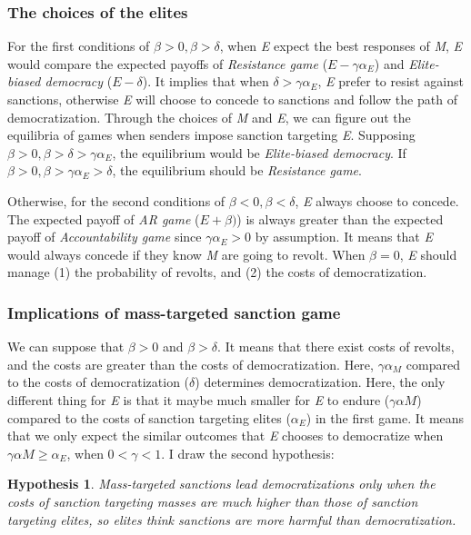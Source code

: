 \documentclass[11pt]{article}
\newtheorem{hyp}{Hypothesis}
\begin{document}
	\subsubsection*{The choices of the elites}
	
	For the first conditions of $\beta > 0, \beta > \delta$, when \textit{E} expect the best responses of \textit{M}, \textit{E} would compare the expected payoffs of \textit{Resistance game} ($E-\gamma\alpha_{E}$) and \textit{Elite-biased democracy} ($E-\delta$). It implies that when $\delta > \gamma\alpha_{E}$, \textit{E} prefer to resist against sanctions, otherwise \textit{E} will choose to concede to sanctions and follow the path of democratization. Through the choices of \textit{M} and \textit{E}, we can figure out the equilibria of games when senders impose sanction targeting \textit{E}. Supposing $\beta > 0, \beta > \delta > \gamma\alpha_{E}$, the equilibrium would be \textit{Elite-biased democracy}. If $\beta > 0, \beta > \gamma\alpha_{E} > \delta$, the equilibrium should be \textit{Resistance game}.
	
	Otherwise, for the second conditions of $\beta <0, \beta < \delta$, \textit{E} always choose to concede. The expected payoff of \textit{AR game} ($E + \beta)$) is always greater than the expected payoff of \textit{Accountability game} since $\gamma\alpha_{E} > 0$ by assumption. It means that \textit{E} would always concede if they know \textit{M} are going to revolt. When $\beta = 0$, \textit{E} should manage (1) the probability of revolts, and (2) the costs of democratization.
	
	\subsubsection*{Implications of mass-targeted sanction game}
	We can suppose that $\beta > 0$ and $\beta > \delta$. It means that there exist costs of revolts, and the costs are greater than the costs of democratization. Here, $\gamma\alpha_{M}$ compared to the costs of democratization ($\delta$) determines democratization. Here, the only different thing for \textit{E} is that it maybe much smaller for \textit{E} to endure ($\gamma\alpha{M}$) compared to the costs of sanction targeting elites ($\alpha_{E}$) in the first game. It means that we only expect the similar outcomes that \textit{E} chooses to democratize when $\gamma\alpha{M} \geq \alpha_{E}$, when $0 < \gamma < 1$. I draw the second hypothesis:
	
	\begin{hyp}
		\label{hyp2}
		Mass-targeted sanctions lead democratizations only when the costs of sanction targeting masses are much higher than those of sanction targeting elites, so elites think sanctions are more harmful than democratization.
	\end{hyp}
	
\end{document}
